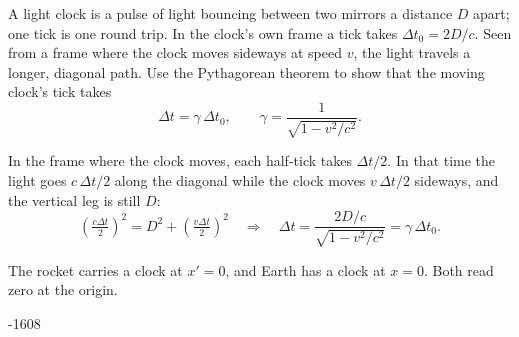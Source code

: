 \documentclass{handout}
\newcommand{\room}[1]{0.35in plus #1fill}
\begin{document}
\begin{questions}
  \question A light clock is a pulse of light bouncing between two mirrors a
  distance $D$ apart; one tick is one round trip. In the clock's own frame a
  tick takes $\Delta t_0 = 2D/c$. Seen from a frame where the clock moves
  sideways at speed $v$, the light travels a longer, diagonal path. Use the
  Pythagorean theorem to show that the moving clock's tick takes
  \[ \Delta t = \gamma\,\Delta t_0, \qquad \gamma = \frac{1}{\sqrt{1-v^2/c^2}}. \]
  \begin{solution}[\room{1}]
    In the frame where the clock moves, each half-tick takes $\Delta t/2$. In
    that time the light goes $c\,\Delta t/2$ along the diagonal while the clock
    moves $v\,\Delta t/2$ sideways, and the vertical leg is still $D$:
    \[ \left(\tfrac{c\Delta t}{2}\right)^2 = D^2 + \left(\tfrac{v\Delta t}{2}\right)^2
       \quad\Rightarrow\quad
       \Delta t = \frac{2D/c}{\sqrt{1-v^2/c^2}} = \gamma\,\Delta t_0 . \]
  \end{solution}
\end{questions}

\newpage
The rocket carries a clock at $x' = 0$, and Earth has a clock at $x = 0$.
Both read zero at the origin.

\begin{center}
\begin{spacetime}[0.95]{-1}{6}{0}{8}
\end{spacetime}
\end{center}
\end{document}
